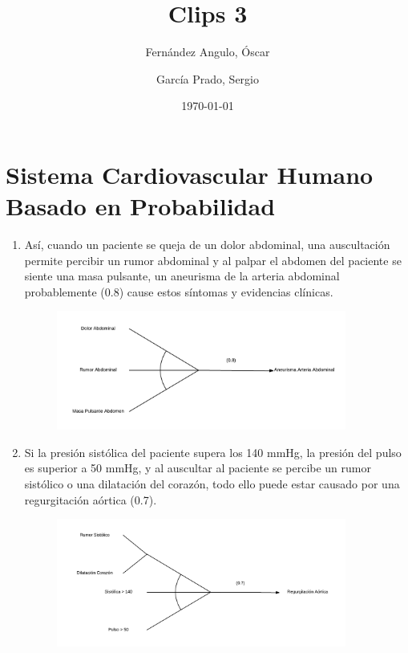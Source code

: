 \documentclass[10pt, a4paper,spanish]{article}
\title{\vspace{-15mm}\fontsize{24pt}{10pt}\selectfont\textbf{Clips 3}} %
\author{
	Fernández Angulo, Óscar \\
	\and
	García Prado, Sergio
}
\date{\today}
\begin{document}
	\maketitle %

	\thispagestyle{fancy} %



	\section{Sistema Cardiovascular Humano Basado en Probabilidad}

		\begin{enumerate}

			\item Así, cuando un paciente se queja de un dolor abdominal, una auscultación permite percibir un rumor abdominal y al palpar el abdomen del paciente se siente una masa pulsante, un aneurisma de la arteria abdominal probablemente (0.8) cause estos síntomas y evidencias clínicas.
			\begin{figure}[H]
				\begin{center}
					\includegraphics[width=0.9\textwidth]{paragraph-1}
				\end{center}
			\end{figure}

			\item Si la presión sistólica del paciente supera los 140 mmHg, la presión del pulso es superior a 50 mmHg, y al auscultar al paciente se percibe un rumor sistólico o una dilatación del corazón, todo ello puede estar causado por una regurgitación aórtica (0.7).
			\begin{figure}[H]
				\begin{center}
					\includegraphics[width=0.9\textwidth]{paragraph-2}
				\end{center}
			\end{figure}


\end{enumerate}
\end{document}
